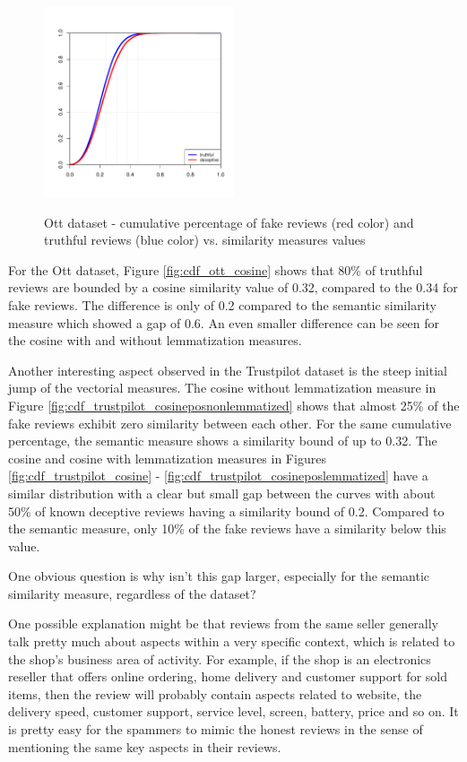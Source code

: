 \begin{figure}[ht]
\begin{center}
{\includegraphics[width=0.5\textwidth]{sweave/sweave-ottcosineposlemmatized}
\label{fig:cdf_ott_cosine_with_lemmatization}}
\caption{Ott dataset - cumulative percentage of fake reviews (red color) and truthful reviews (blue color) vs. similarity measures values}    
\label{fig:cdf_ott}
\end{center}
\end{figure}

\clearpage 

For the Ott dataset, Figure \ref{fig:cdf_ott_cosine} shows that 80\% of truthful reviews are bounded by a cosine similarity value of 0.32, compared to the 0.34 for fake reviews. The difference is only of 0.2 compared to the semantic similarity measure which showed a gap of 0.6. An even smaller difference can be seen for the cosine with and without lemmatization measures. 

Another interesting aspect observed in the Trustpilot dataset is the steep initial jump of the vectorial measures. The cosine without lemmatization measure in Figure \ref{fig:cdf_trustpilot_cosineposnonlemmatized} shows that almost 25\% of the fake reviews exhibit zero similarity between each other. For the same cumulative percentage, the semantic measure shows a similarity bound of up to 0.32. The cosine and cosine with lemmatization measures in Figures \ref{fig:cdf_trustpilot_cosine} - \ref{fig:cdf_trustpilot_cosineposlemmatized} have a similar distribution with a clear but small gap between the curves with about 50\% of known deceptive reviews having a similarity bound of 0.2. Compared to the semantic measure, only 10\% of the fake reviews have a similarity below this value.

One obvious question is why isn't this gap larger, especially for the semantic similarity measure, regardless of the dataset? 

One possible explanation might be that reviews from the same seller generally talk pretty much about aspects within a very specific context, which is related to the shop's business area of activity. For example, if the shop is an electronics reseller that offers online ordering, home delivery and customer support for sold items, then the review will probably contain aspects related to website, the delivery speed, customer support, service level, screen, battery, price and so on. It is pretty easy for the spammers to mimic the honest reviews in the sense of mentioning the same key aspects in their reviews.

